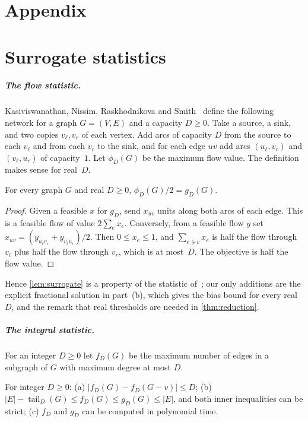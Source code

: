 \documentclass[anonymous,a4paper,USenglish,cleveref,autoref,thm-restate]{socg-lipics-v2021}
\newcommand{\tail}{\operatorname{tail}}
\begin{document}
\appendix
\clearpage
\section*{Appendix}

\section{Surrogate statistics}
\label{app:surrogates}

\subparagraph*{The flow statistic.}
Kasiviswanathan, Nissim, Raskhodnikova and Smith~\cite{KNRS13} define the following network for a graph $G=(V,E)$ and a capacity $D\ge0$. Take a source, a sink, and two copies $v_\ell,v_r$ of each vertex. Add arcs of capacity $D$ from the source to each $v_\ell$ and from each $v_r$ to the sink, and for each edge $uv$ add arcs $(u_\ell,v_r)$ and $(v_\ell,u_r)$ of capacity~$1$. Let $\phi_D(G)$ be the maximum flow value. The definition makes sense for real~$D$.

\begin{proposition}
\label{prop:flow-lp}
For every graph $G$ and real $D\ge0$, $\phi_D(G)/2=g_D(G)$.
\end{proposition}

\begin{proof}
Given a feasible $x$ for $g_D$, send $x_{uv}$ units along both arcs of each edge. This is a feasible flow of value $2\sum_ex_e$. Conversely, from a feasible flow $y$ set $x_{uv}=(y_{u_\ell v_r}+y_{v_\ell u_r})/2$. Then $0\le x_e\le1$, and $\sum_{e\ni v}x_e$ is half the flow through $v_\ell$ plus half the flow through $v_r$, which is at most~$D$. The objective is half the flow value.
\end{proof}

Hence \cref{lem:surrogate} is a property of the statistic of~\cite{KNRS13}; our only additions are the explicit fractional solution in part~(b), which gives the bias bound for every real $D$, and the remark that real thresholds are needed in \cref{thm:reduction}.

\subparagraph*{The integral statistic.}
For an integer $D\ge0$ let $f_D(G)$ be the maximum number of edges in a subgraph of $G$ with maximum degree at most $D$.

\begin{proposition}
\label{prop:integral}
For integer $D\ge0$: (a) $|f_D(G)-f_D(G-v)|\le D$; (b) $|E|-\tail_D(G)\le f_D(G)\le g_D(G)\le|E|$, and both inner inequalities can be strict; (c) $f_D$ and $g_D$ can be computed in polynomial time.
\end{proposition}
\end{document}
